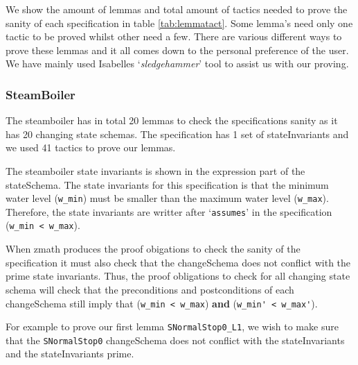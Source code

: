 We show the amount of lemmas and total amount of tactics needed to prove the sanity of each specification in table \ref{tab:lemmatact}. Some lemma's need only one tactic to be proved whilst other need a few. There are various different ways to prove these lemmas and it all comes down to the personal preference of the user. We have mainly used Isabelles `\emph{sledgehammer}' tool to assist us with our proving.

\subsubsection{SteamBoiler}

The steamboiler has in total 20 lemmas to check the specifications sanity as it has 20 changing state schemas. The specification has 1 set of stateInvariants and we used 41 tactics to prove our lemmas.

The steamboiler state invariants is shown in the expression part of the stateSchema. The state invariants for this specification is that the minimum water level (\verb|w_min|) must be smaller than the maximum water level (\verb|w_max|). Therefore, the state invariants are writter after `\texttt{assumes}' in the specification (\verb|w_min < w_max|). 

When \gls{zmath} produces the proof obigations to check the sanity of the specification it must also check that the changeSchema does not conflict with the prime state invariants. Thus, the proof obligations to check for all changing state schema will check that the preconditions and postconditions of each changeSchema still imply that (\verb|w_min < w_max|) \textbf{and} (\verb|w_min' < w_max'|).

For example to prove our first lemma \verb|SNormalStop0_L1|, we wish to make sure that the \verb|SNormalStop0| changeSchema does not conflict with the stateInvariants and the stateInvariants prime.

